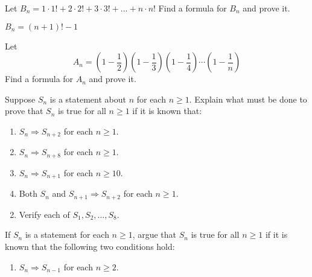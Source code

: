 \begin{multicols}{2}
\begin{ex}
Let $B_{n} = 1 \cdot 1! + 2 \cdot 2! + 3 \cdot 3! + \dots  + n \cdot n$! Find a formula for $B_{n}$ and prove it.

\begin{sol}
$B_{n} = (n + 1)! - 1$
\end{sol}
\end{ex}

\begin{ex}
Let 
\begin{equation*}
A_n = (1-\frac{1}{2})(1-\frac{1}{3})(1-\frac{1}{4})\cdots (1-\frac{1}{n})
\end{equation*}
Find a formula for $A_n$ and prove it.
\end{ex}

\begin{ex}
Suppose $S_{n}$ is a statement about $n$ for each $n \geq 1$. Explain what must be done to prove that $S_{n}$ is true for all $n \geq 1$ if it is known that:


\begin{enumerate}[label={\alph*.}]
\item  $S_{n} \Rightarrow S_{n+2}$ for each $n \geq 1$.

\item $S_{n} \Rightarrow S_{n+8}$ for each $n \geq 1$.

\item $S_{n} \Rightarrow S_{n+1}$ for each $n \geq 10$.

\item Both $S_{n}$ and $S_{n+1} \Rightarrow S_{n+2}$ for each $n \geq 1$.

\end{enumerate}
\begin{sol}
\begin{enumerate}[label={\alph*.}]
\setcounter{enumi}{1}
\item  Verify each of $S_{1}, S_{2}, \dots, S_{8}$.

\end{enumerate}
\end{sol}
\end{ex}

\begin{ex}
If $S_{n}$ is a statement for each $n \geq 1$, argue that $S_{n}$ is true for all $n \geq 1$ if it is known that the following two conditions hold:


\begin{enumerate}
\item $S_{n} \Rightarrow S_{n-1}$ for each $n \geq 2$.


\end{enumerate}
\end{ex}
\end{multicols}
